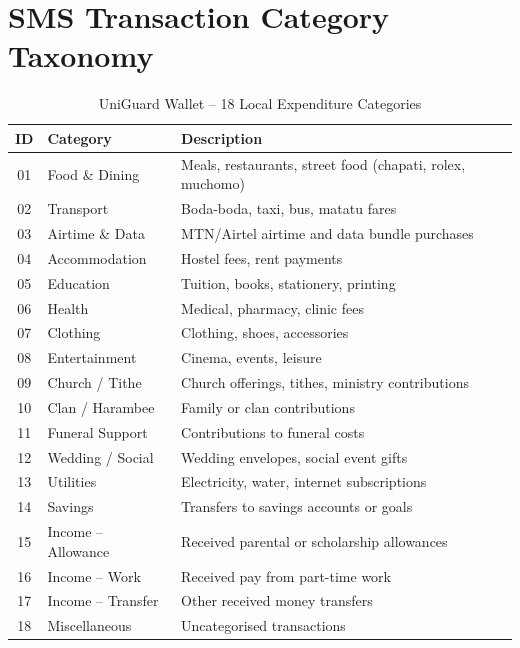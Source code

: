 \documentclass[12pt,a4paper]{report}
\begin{document}
\chapter{SMS Transaction Category Taxonomy}

\begin{table}[H]
\centering
\caption{UniGuard Wallet -- 18 Local Expenditure Categories}
\label{tab:categories}
\begin{tabular}{clp{6cm}}
\toprule
\textbf{ID} & \textbf{Category} & \textbf{Description} \\
\midrule
01 & Food \& Dining         & Meals, restaurants, street food (chapati, rolex, muchomo) \\
02 & Transport              & Boda-boda, taxi, bus, matatu fares \\
03 & Airtime \& Data        & MTN/Airtel airtime and data bundle purchases \\
04 & Accommodation          & Hostel fees, rent payments \\
05 & Education              & Tuition, books, stationery, printing \\
06 & Health                 & Medical, pharmacy, clinic fees \\
07 & Clothing               & Clothing, shoes, accessories \\
08 & Entertainment          & Cinema, events, leisure \\
09 & Church / Tithe         & Church offerings, tithes, ministry contributions \\
10 & Clan / Harambee        & Family or clan contributions \\
11 & Funeral Support        & Contributions to funeral costs \\
12 & Wedding / Social       & Wedding envelopes, social event gifts \\
13 & Utilities              & Electricity, water, internet subscriptions \\
14 & Savings                & Transfers to savings accounts or goals \\
15 & Income -- Allowance    & Received parental or scholarship allowances \\
16 & Income -- Work         & Received pay from part-time work \\
17 & Income -- Transfer     & Other received money transfers \\
18 & Miscellaneous          & Uncategorised transactions \\
\bottomrule
\end{tabular}
\end{table}
\end{document}
